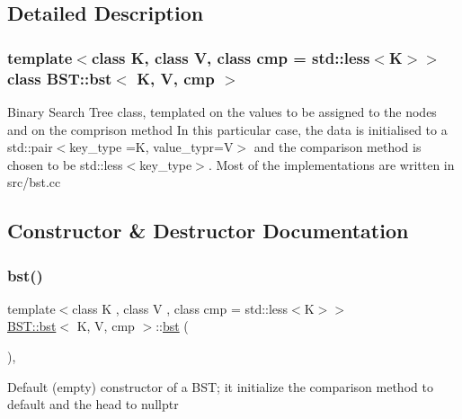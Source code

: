 \subsection{Detailed Description}
\subsubsection*{template$<$class K, class V, class cmp = std\+::less$<$\+K$>$$>$\newline
class B\+S\+T\+::bst$<$ K, V, cmp $>$}

Binary Search Tree class, templated on the values to be assigned to the nodes and on the comprison method In this particular case, the data is initialised to a std\+::pair$<$key\+\_\+type =K, value\+\_\+typr=V$>$ and the comparison method is chosen to be std\+::less$<$key\+\_\+type$>$. Most of the implementations are written in src/bst.\+cc 

\subsection{Constructor \& Destructor Documentation}
\mbox{\label{classBST_1_1bst_a4e9627986dc492f5b5ca99d81073cbae}} 
\subsubsection{\texorpdfstring{bst()}{bst()}\hspace{0.1cm}{\footnotesize\ttfamily [1/3]}}
{\footnotesize\ttfamily template$<$class K , class V , class cmp  = std\+::less$<$\+K$>$$>$ \\
\hyperlink{classBST_1_1bst}{B\+S\+T\+::bst}$<$ K, V, cmp $>$\+::\hyperlink{classBST_1_1bst}{bst} (\begin{DoxyParamCaption}{ }\end{DoxyParamCaption})\hspace{0.3cm}{\ttfamily [inline]}, {\ttfamily [noexcept]}}

Default (empty) constructor of a B\+ST; it initialize the comparison method to default and the head to nullptr \mbox{\label{classBST_1_1bst_a2e920ad809f46ab051c9f49d5108bc70}} 
